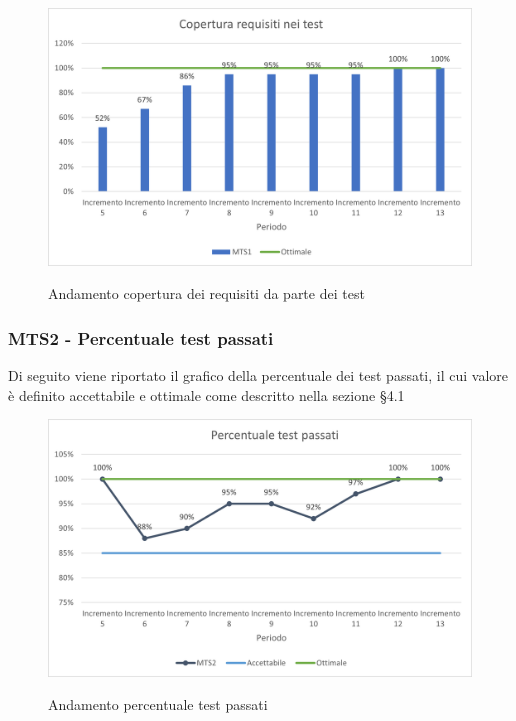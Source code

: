 \begin{figure}[H]
\centering
\includegraphics[scale=0.78]{res/ResocontoAttivitaDiVerifica/res/metriche/grafici/img/MTS1.png}\\
\caption{Andamento copertura dei requisiti da parte dei test}
\end{figure}


\subsubsection{MTS2 - Percentuale test passati}
Di seguito viene riportato il grafico della percentuale dei test passati, il cui valore è definito accettabile e ottimale come descritto nella sezione §4.1\\

\begin{figure}[H]
\centering
\includegraphics[scale=0.78]{res/ResocontoAttivitaDiVerifica/res/metriche/grafici/img/MTS2.png}\\
\caption{Andamento percentuale test passati}
\end{figure}

